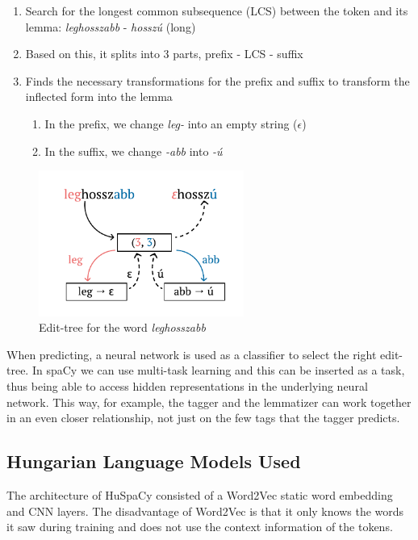 \documentclass{llncs}
\begin{document}
\begin{enumerate}
    \item Search for the longest common subsequence (LCS) between the token and its lemma: \textit{leghosszabb} - \textit{hosszú} (long)
    \item Based on this, it splits into 3 parts, prefix - LCS - suffix
    \item Finds the necessary transformations for the prefix and suffix to transform the inflected form into the lemma
    \begin{enumerate}
        \item In the prefix, we change \textit{leg-} into an empty string ($\epsilon$)
        \item In the suffix, we change \textit{-abb} into \textit{-ú}
    \end{enumerate}
\end{enumerate}

\begin{figure}[h]
  \centering
  \includegraphics[width=0.6\textwidth]{edit-tree-fig.pdf}
  \caption{Edit-tree for the word \textit{leghosszabb}}
  \label{fig:edit-tree}
\end{figure}

When predicting, a neural network is used as a classifier to select the right edit-tree. In spaCy we can use multi-task learning and this can be inserted as a task, thus being able to access hidden representations in the underlying neural network. This way, for example, the tagger and the lemmatizer can work together in an even closer relationship, not just on the few tags that the tagger predicts.

\subsection{Hungarian Language Models Used} \label{neuralnetbehind}

The architecture of HuSpaCy \citep{HuSpaCy:2021} consisted of a Word2Vec \citep{word2vec} static word embedding and CNN layers. The disadvantage of Word2Vec is that it only knows the words it saw during training and does not use the context information of the tokens. 
\end{document}
